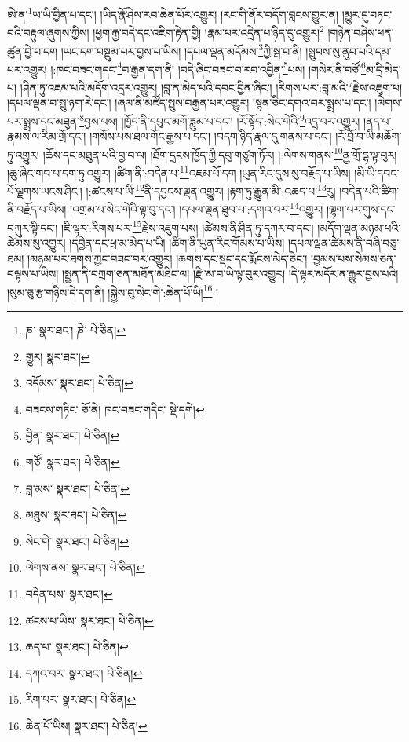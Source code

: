 ཨེ་ན་\footnote{ཎ་  སྣར་ཐང་། ཎེ་  པེ་ཅིན། }ཡ་ཡི་བྱིན་པ་དང་། །ཡིད་རྣོ་ཤེས་རབ་ཆེན་པོར་འགྱུར། །རང་གི་ནོར་བདོག་བླངས་གྱུར་ན། །མྱུར་དུ་བཏང་བའི་བརྟུལ་ཞུགས་ཀྱིས། །ཕྱག་རྒྱ་བདེ་དང་འཇིག་རྟེན་གྱི། །རྣམ་པར་འདྲེན་པ་ཉིད་དུ་འགྱུར།\footnote{གྱུར།  སྣར་ཐང་། } །གཉེན་བཤེས་ཕན་ཚུན་བྱེ་བ་དག །ཡང་དག་བསྡུམ་པར་བྱས་པ་ཡིས། །དཔལ་ལྡན་མདོམས་\footnote{འདོམས་  སྣར་ཐང་།  པེ་ཅིན། }ཀྱི་སྦ་བ་ནི། །སྦུབས་སུ་ནུབ་པའི་དམ་པར་འགྱུར། །:ཁང་བཟང་གདང་\footnote{བཟངས་གཏིང་  ཅོ་ནེ། ཁང་བཟང་གདིང་  སྡེ་དགེ། }བ་རྒྱན་དག་ནི། །བདེ་ཞིང་བཟང་བ་རབ་འབྱིན་\footnote{བྱིན་  སྣར་ཐང་།  པེ་ཅིན། }པས། །གསེར་ནི་བཙོ་\footnote{གཙོ་  སྣར་ཐང་།  པེ་ཅིན། }མ་དྲི་མེད་པ། །ཤིན་ཏུ་འཇམ་པའི་མདོག་འདྲར་འགྱུར། །བླ་ན་མེད་པའི་དབང་བྱིན་ཞིང་། །རིགས་པར་:བླ་མའི་\footnote{བླ་མས་  སྣར་ཐང་།  པེ་ཅིན། }རྗེས་འཇུག་པ། །དཔལ་ལྡན་བ་སྤུ་ཉག་རེ་དང་། །ཞལ་ནི་མཛོད་སྤུས་བརྒྱན་པར་འགྱུར། །སྙན་ཅིང་དགའ་བར་སྨྲས་པ་དང་། །ལེགས་པར་སྨྲས་དང་མཐུན་\footnote{མཐུས་  སྣར་ཐང་།  པེ་ཅིན། }བྱས་པས། །ཁྱོད་ནི་དཔུང་མགོ་ཟླུམ་པ་དང་། །རོ་སྟོད་:སེང་གེའི་\footnote{སེང་གེ་  སྣར་ཐང་།  པེ་ཅིན། }འདྲ་བར་འགྱུར། །ནད་པ་རྣམས་ལ་རིམ་གྲོ་དང་། །གསོས་པས་ཐལ་གོང་རྒྱས་པ་དང་། །བདག་ཉིད་རྣལ་དུ་གནས་པ་དང་། །རོ་བྲོ་བ་ཡི་མཆོག་ཏུ་འགྱུར། །ཆོས་དང་མཐུན་པའི་བྱ་བ་ལ། །ཐོག་དྲངས་ཁྱོད་ཀྱི་དབུ་གཙུག་ཏོར། །:ལེགས་གནས་\footnote{ལེགས་ནས་  སྣར་ཐང་།  པེ་ཅིན། }ནྱ་གྲོ་དྷ་ལྟ་བུར། །ཆུ་ཞེང་གབ་པ་དག་ཏུ་འགྱུར། །ཚིག་ནི་:བདེན་པ་\footnote{བདེན་པས་  སྣར་ཐང་། }འཇམ་པོ་དག །ཡུན་རིང་དུས་སུ་བརྗོད་པ་ཡིས། །མི་ཡི་དབང་པོ་ལྗགས་ཡངས་ཤིང་། །:ཚངས་པ་ཡི་\footnote{ཚངས་པ་ཡིས་  སྣར་ཐང་།  པེ་ཅིན། }ནི་དབྱངས་ལྡན་འགྱུར། །རྟག་ཏུ་རྒྱུན་མི་:འཆད་པ་\footnote{ཆད་པ་  སྣར་ཐང་།  པེ་ཅིན། }རུ། །བདེན་པའི་ཚིག་ནི་བརྗོད་པ་ཡིས། །འགྲམ་པ་སེང་གེའི་ལྟ་བུ་དང་། །དཔལ་ལྡན་ཐུབ་པ་:དགའ་བར་\footnote{དཀའ་བར་  སྣར་ཐང་།  པེ་ཅིན། }འགྱུར། །ལྷག་པར་གུས་དང་བཀུར་སྟི་དང་། །ཇི་ལྟར་:རིགས་པར་\footnote{རིག་པར་  སྣར་ཐང་།  པེ་ཅིན། }རྗེས་འཇུག་པས། །ཚེམས་ནི་ཤིན་ཏུ་དཀར་བ་དང་། །མདོག་ལྡན་མཉམ་པའི་ཚེམས་སུ་འགྱུར། །དབྱེན་དང་ཕྲ་མ་མེད་པ་ཡི། །ཚིག་ནི་ཡུན་རིང་གོམས་པ་ཡིས། །དཔལ་ལྡན་ཚེམས་ནི་བཞི་བཅུ་ཐམ། །མཉམ་པར་ཐགས་ཀྱང་བཟང་བར་འགྱུར། །ཆགས་དང་སྡང་དང་རྨོངས་མེད་ཅིང་། །བྱམས་པས་སེམས་ཅན་བལྟས་པ་ཡིས། །སྤྱན་ནི་བཀྲག་ཅན་མཐོན་མཐིང་ལ། །རྫི་མ་བ་ཡི་ལྟ་བུར་འགྱུར། །དེ་ལྟར་མདོར་ན་རྒྱུར་བྱས་པའི། །སུམ་ཅུ་རྩ་གཉིས་དེ་དག་ནི། །སྐྱེས་བུ་སེང་གེ་:ཆེན་པོ་ཡི།\footnote{ཆེན་པོ་ཡིས།  སྣར་ཐང་།  པེ་ཅིན། } །
